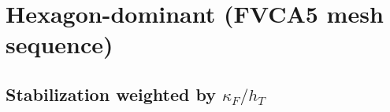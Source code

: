 \documentclass[10pt]{article}
\begin{document}
%
%
\section{Hexagon-dominant (FVCA5 mesh sequence)}
\subsection{Stabilization weighted by $\kappa_F/h_T$}
\begin{figure}[ht]
    \centering
      \scalebox{0.4}{}%
      \scalebox{0.4}{}%
      \scalebox{0.4}{}
      \scalebox{0.4}{}%
      \scalebox{0.4}{}%
      \scalebox{0.4}{}
  \end{figure}
\end{document}
